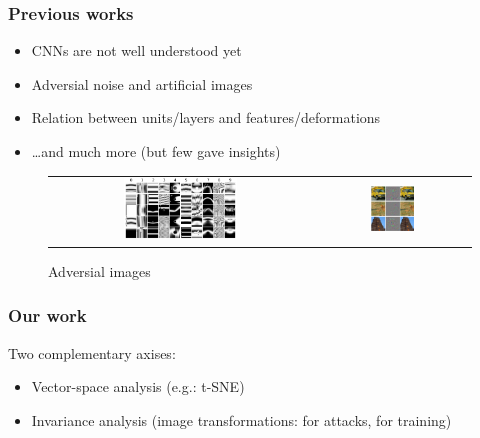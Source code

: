\documentclass[10pt]{beamer}
\newcommand{\eg}{e.g.}
\begin{document}
\begin{frame}
    \frametitle{Previous works}
    \begin{itemize}
        \item CNNs are not well understood yet
        \item Adversial noise and artificial images
        \item Relation between units/layers and features/deformations
        \item \dots and much more (but few gave insights)
    \end{itemize}
    \begin{figure}[h]
        \begin{tabular}[]{c|c}
            \includegraphics[width=0.45\textwidth]{midpres_figures/adversial_unrecogni.png}
            &
            \includegraphics[width=0.3\textwidth]{midpres_figures/adversial_imagenet.png}
        \end{tabular}
        \caption{Adversial images}
    \end{figure}
\end{frame}

\begin{frame}
    \frametitle{Our work}
    Two complementary axises:
    \begin{itemize}
        \item Vector-space analysis (\eg: t-SNE)
        \item Invariance analysis (image transformations: for attacks, for training)
    \end{itemize}
\end{frame}
\end{document}
